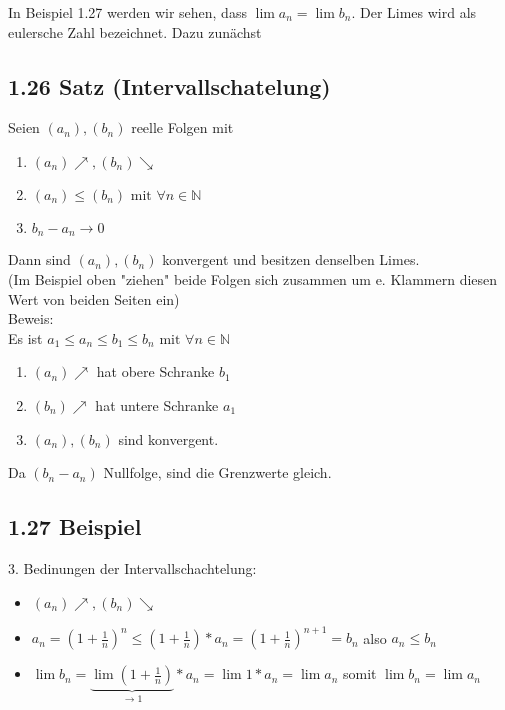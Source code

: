 \documentclass[12pt]{article}
\begin{document}
In Beispiel 1.27 werden wir sehen, dass $\lim a_n = \lim b_n$. Der Limes wird als eulersche Zahl bezeichnet. Dazu zunächst


\subsection*{1.26 Satz (Intervallschatelung)}

Seien $(a_n),(b_n)$ reelle Folgen mit
\begin{enumerate}
	\item $(a_n) \nearrow , (b_n) \searrow$
	\item $(a_n) \leq (b_n) \text{ mit } \forall n \in \mathbb{N}$
	\item $b_n - a_n \rightarrow 0$
\end{enumerate}
Dann sind $(a_n),(b_n)$ konvergent und besitzen denselben Limes. \\
(Im Beispiel oben "ziehen" beide Folgen sich zusammen um e. Klammern diesen Wert von beiden Seiten ein)\\
Beweis:\\
Es ist $a_1 \leq a_n \leq b_1 \leq b_n \text{ mit } \forall n \in \mathbb{N}$\\
\begin{enumerate}
	\item $(a_n) \nearrow$ hat obere Schranke $b_1$\\
	\item $(b_n) \nearrow$ hat untere Schranke $a_1$\\
	\item $(a_n),(b_n)$ sind konvergent.
\end{enumerate}
Da $(b_n - a_n)$ Nullfolge, sind die Grenzwerte gleich. 

\subsection*{1.27 Beispiel}
3. Bedinungen der Intervallschachtelung:\\
\begin{itemize}
	\item $(a_n) \nearrow , (b_n) \searrow$
	\item $a_n = (1+\frac{1}{n})^n \leq (1+\frac{1}{n}) *a_n = (1+\frac{1}{n})^{n+1} = b_n$ also $a_n \leq b_n$ \\
	\item $\lim b_n = \underbrace{\lim (1+ \frac{1}{n})}_{\rightarrow 1} * a_n = \lim 1 *a_n = \lim a_n$ somit $\lim b_n = \lim a_n$
\end{itemize}
\end{document}
